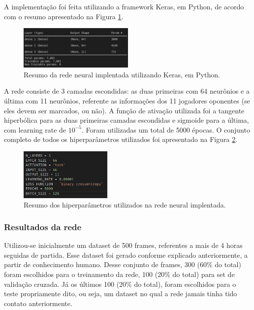 \documentclass[a4paper,12pt]{article}
\begin{document}
A implementação foi feita utilizando a framework Keras, em Python, de acordo com o resumo apresentado na Figura \ref{fig:network-summary}.

\begin{figure}[H]
	\centering
	\includegraphics[width=0.5\textwidth]{figures/network_summary.jpeg}
   \caption{Resumo da rede neural implentada utilizando Keras, em Python.} \label{fig:network-summary}
\end{figure}

A rede consiste de 3 camadas escondidas: as duas primeiras com 64 neurônios e a última com 11 neurônios, referente as informações dos 11 jogadores oponentes (se eles devem ser marcados, ou não). A função de ativação utilizada foi a tangente hiperbólica para as duas primeiras camadas escondidas e sigmoide para a última, com learning rate de $10^{-5}$. Foram utilizadas um total de 5000 épocas. O conjunto completo de todos os hiperparâmetros utilizados foi apresentado na Figura \ref{fig:hiperparametros}.

\begin{figure}[H]
	\centering
	\includegraphics[width=0.4\textwidth]{figures/hiperparametros.png}
   \caption{Resumo dos hiperparâmetros utilizados na rede neural implentada.} \label{fig:hiperparametros}
\end{figure}

\subsubsection{Resultados da rede}

Utilizou-se inicialmente um dataset de 500 frames, referentes a mais de 4 horas seguidas de partida. Esse dataset foi gerado conforme explicado anteriormente, a partir de conhecimento humano. Desse conjunto de frames, 300 (60\% do total) foram escolhidos para o treinamento da rede, 100 (20\% do total) para set de validação cruzada. Já os últimos 100 (20\% do total), foram escolhidos para o teste propriamente dito, ou seja, um dataset no qual a rede jamais tinha tido contato anteriormente.
\end{document}
